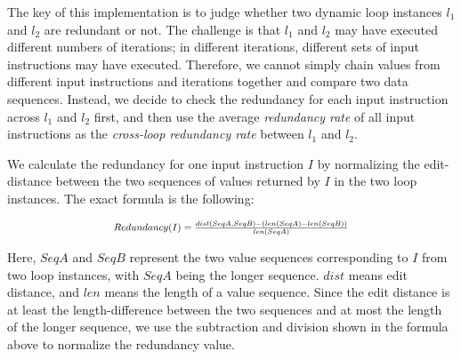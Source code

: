 The key of this implementation is
to judge whether two dynamic loop instances $l_1$ and $l_2$ 
are redundant or not.
The challenge is that $l_1$ and $l_2$ may have executed different numbers of
iterations; in different iterations, different sets of input instructions
may have executed. Therefore, we cannot simply chain values from different
input instructions and iterations together and compare two data sequences.
Instead, we decide to check the redundancy for each input instruction across
$l_1$ and $l_2$ first, and then use the average \textit{redundancy rate} of
all input instructions as the \textit{cross-loop redundancy rate} between
$l_1$ and $l_2$. 

We calculate the redundancy for one input instruction $I$ by normalizing the
edit-distance between the two sequences of values returned by $I$ in the two
loop instances. The exact formula is the following:


\[
\Scale[0.8]{
	Redundancy(I) =  \frac{dist(SeqA,SeqB) - (len(SeqA) - len(SeqB))}{len(SeqA)}
}
\]

Here, $SeqA$ and $SeqB$ represent the two value sequences corresponding to $I$
from two loop instances, with $SeqA$ being the longer sequence.
$dist$ means edit distance, and $len$ means the length of a value sequence.
Since the edit distance is at least the length-difference between the
two sequences and at most the length of the longer sequence, we use the 
subtraction and division shown in the formula above to normalize the
redundancy value.



